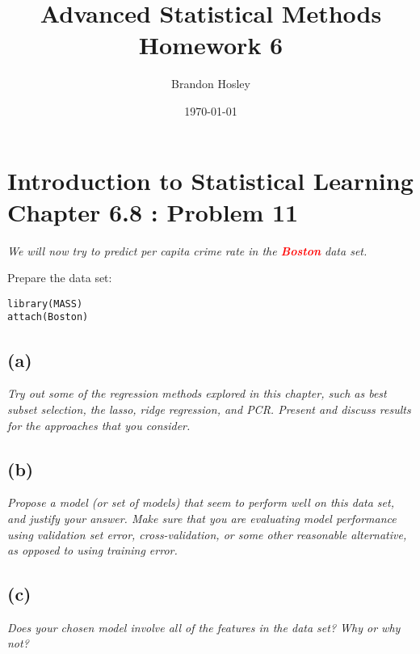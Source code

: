 \documentclass[a4paper,man,natbib]{apa6}
\title{Advanced Statistical Methods Homework 6}
\author{Brandon Hosley}
\date{\today}
\affiliation{University of Illinois - Springfield}
\begin{document}
\maketitle
\singlespacing

\section{Introduction to Statistical Learning \\ Chapter 6.8 : Problem 11}
\emph{We will now try to predict per capita crime rate in the
	\textbf{\textcolor{red}{Boston}} data set.}

Prepare the data set:

\begin{verbatim}
library(MASS)
attach(Boston)
\end{verbatim}

\subsection{(a)} 
\emph{Try out some of the regression methods explored in this chapter,
	such as best subset selection, the lasso, ridge regression, and
	PCR. Present and discuss results for the approaches that you
	consider.}

\subsection{(b)} 
\emph{Propose a model (or set of models) that seem to perform well on
	this data set, and justify your answer. Make sure that you are
	evaluating model performance using validation set error, cross-validation, or some other reasonable alternative, as opposed to
	using training error.}

\subsection{(c)} 
\emph{Does your chosen model involve all of the features in the data
	set? Why or why not?}
\end{document}
